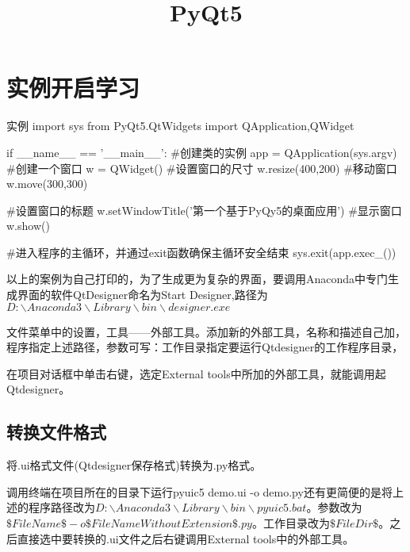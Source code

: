 \documentclass[openbib]{article}
\begin{document}
	
	\title{PyQt5}
	
	
	\maketitle
	
	\newpage
	\tableofcontents
	\newpage
	\section{实例开启学习}
	\begin{Python}{实例}
import sys
from PyQt5.QtWidgets import QApplication,QWidget

if __name__ == '__main__':
	#创建类的实例
	app = QApplication(sys.argv)
	#创建一个窗口
	w = QWidget()
	#设置窗口的尺寸
	w.resize(400,200)
	#移动窗口
	w.move(300,300)
	
	#设置窗口的标题
	w.setWindowTitle('第一个基于PyQy5的桌面应用')
	#显示窗口
	w.show()
	
	#进入程序的主循环，并通过exit函数确保主循环安全结束
	sys.exit(app.exec_())
	\end{Python}
以上的案例为自己打印的，为了生成更为复杂的界面，要调用Anaconda中专门生成界面的软件QtDesigner命名为Start Designer,路径为$D:\backslash Anaconda3\backslash Library\backslash bin\backslash designer.exe$

文件菜单中的设置，工具——外部工具。添加新的外部工具，名称和描述自己加，程序指定上述路径，参数可写：工作目录指定要运行Qtdesigner的工作程序目录，

在项目对话框中单击右键，选定External tools中所加的外部工具，就能调用起Qtdesigner。

\subsection{转换文件格式}
将.ui格式文件(Qtdesigner保存格式)转换为.py格式。

调用终端在项目所在的目录下运行pyuic5 demo.ui -o demo.py还有更简便的是将上述的程序路径改为$D:\backslash Anaconda3\backslash Library\backslash bin\backslash pyuic5.bat$。参数改为$\$FileName\$ -o \$FileNameWithoutExtension\$.py$。工作目录改为$\$FileDir\$$。之后直接选中要转换的.ui文件之后右键调用External tools中的外部工具。
\end{document}
